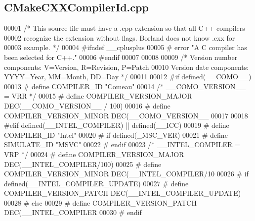 \subsection{C\+Make\+C\+X\+X\+Compiler\+Id.\+cpp}
\label{soapysdr_2build_2CMakeFiles_23_85_81_2CompilerIdCXX_2CMakeCXXCompilerId_8cpp_source}

\begin{DoxyCode}
00001 \textcolor{comment}{/* This source file must have a .cpp extension so that all C++ compilers}
00002 \textcolor{comment}{   recognize the extension without flags.  Borland does not know .cxx for}
00003 \textcolor{comment}{   example.  */}
00004 \textcolor{preprocessor}{#ifndef \_\_cplusplus}
00005 \textcolor{preprocessor}{# error "A C compiler has been selected for C++."}
00006 \textcolor{preprocessor}{#endif}
00007 
00008 
00009 \textcolor{comment}{/* Version number components: V=Version, R=Revision, P=Patch}
00010 \textcolor{comment}{   Version date components:   YYYY=Year, MM=Month,   DD=Day  */}
00011 
00012 \textcolor{preprocessor}{#if defined(\_\_COMO\_\_)}
00013 \textcolor{preprocessor}{# define COMPILER\_ID "Comeau"}
00014   \textcolor{comment}{/* \_\_COMO\_VERSION\_\_ = VRR */}
00015 \textcolor{preprocessor}{# define COMPILER\_VERSION\_MAJOR DEC(\_\_COMO\_VERSION\_\_ / 100)}
00016 \textcolor{preprocessor}{# define COMPILER\_VERSION\_MINOR DEC(\_\_COMO\_VERSION\_\_ %
00017 
00018 \textcolor{preprocessor}{#elif defined(\_\_INTEL\_COMPILER) || defined(\_\_ICC)}
00019 \textcolor{preprocessor}{# define COMPILER\_ID "Intel"}
00020 \textcolor{preprocessor}{# if defined(\_MSC\_VER)}
00021 \textcolor{preprocessor}{#  define SIMULATE\_ID "MSVC"}
00022 \textcolor{preprocessor}{# endif}
00023   \textcolor{comment}{/* \_\_INTEL\_COMPILER = VRP */}
00024 \textcolor{preprocessor}{# define COMPILER\_VERSION\_MAJOR DEC(\_\_INTEL\_COMPILER/100)}
00025 \textcolor{preprocessor}{# define COMPILER\_VERSION\_MINOR DEC(\_\_INTEL\_COMPILER/10 %
00026 \textcolor{preprocessor}{# if defined(\_\_INTEL\_COMPILER\_UPDATE)}
00027 \textcolor{preprocessor}{#  define COMPILER\_VERSION\_PATCH DEC(\_\_INTEL\_COMPILER\_UPDATE)}
00028 \textcolor{preprocessor}{# else}
00029 \textcolor{preprocessor}{#  define COMPILER\_VERSION\_PATCH DEC(\_\_INTEL\_COMPILER   %
00030 \textcolor{preprocessor}{# endif}
}}}
\end{DoxyCode}

